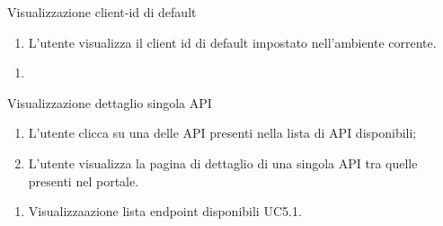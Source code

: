 \begin{usecase}{4.2}{Visualizzazione client-id di default}\label{uc:visualizzazione-client-id-di-default}

    \usecasemain{}
        \begin{enumerate}
            \item L'utente visualizza il client id di default impostato nell'ambiente corrente.
        \end{enumerate}

\end{usecase}


\begin{usecase}{}{}\label{uc:}
    \usecasepre{}
    \usecasedesc{}
    \usecasepost{}

    \usecasemain{}
        \begin{enumerate}
            \item 
        \end{enumerate}

\end{usecase}

\begin{usecase}{5}{Visualizzazione dettaglio singola API}\label{uc:visualizzazione-dettaglio-singola-api}

    \usecasemain{}
        \begin{enumerate}
            \item L'utente clicca su una delle API presenti nella lista di API disponibili;
            \item L'utente visualizza la pagina di dettaglio di una singola API tra quelle presenti nel portale.
        \end{enumerate}

    \usecasegen{}
        \begin{enumerate}
            \item Visualizzaazione lista endpoint disponibili UC5.1.
        \end{enumerate}


\end{usecase}



